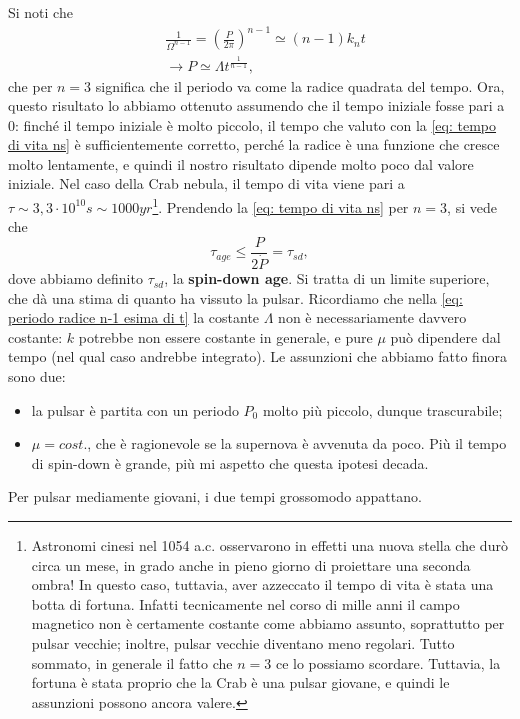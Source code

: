 Si noti che
\begin{align}
    &\frac{1}{\Omega^{n-1}}= \left(\frac{P}{2\pi}\right)^{n-1} \simeq (n-1)k_nt \\
    &\xrightarrow{} P\simeq\Lambda t^{\frac{1}{n-1}},
    \label{eq: periodo radice n-1 esima di t}
\end{align}
che per $n=3$ significa che il periodo va come la radice quadrata del tempo.
Ora, questo risultato lo abbiamo ottenuto assumendo che il tempo iniziale fosse pari a $0$: finché il tempo iniziale è molto piccolo, il tempo che valuto con la \eqref{eq: tempo di vita ns} è sufficientemente corretto, perché la radice è una funzione che cresce molto lentamente, e quindi il nostro risultato dipende molto poco dal valore iniziale.
Nel caso della Crab nebula, il tempo di vita viene pari a $\tau\sim3,3\cdot10^{10}s \sim 1000yr$\footnote{Astronomi cinesi nel 1054 a.c. osservarono in effetti una nuova stella che durò circa un mese, in grado anche in pieno giorno di proiettare una seconda ombra!
In questo caso, tuttavia, aver azzeccato il tempo di vita è stata una botta di fortuna. 
Infatti tecnicamente nel corso di mille anni il campo magnetico non è certamente costante  come abbiamo assunto, soprattutto per pulsar vecchie; inoltre, pulsar vecchie diventano meno regolari. 
Tutto sommato, in generale il fatto che $n=3$ ce lo possiamo scordare.
Tuttavia, la fortuna è stata proprio che la Crab è una pulsar giovane, e quindi le assunzioni possono ancora valere.}. 
Prendendo la \eqref{eq: tempo di vita ns} per $n=3$, si vede che 
\begin{equation}
    \tau_{age}\leq \frac{P}{2\dot{P}} = \tau_{sd},
\end{equation}
dove abbiamo definito $\tau_{sd}$, la \textbf{spin-down age}.
Si tratta di un limite superiore, che dà una stima di quanto ha vissuto la pulsar.
Ricordiamo che nella \eqref{eq: periodo radice n-1 esima di t} la costante $\Lambda$ non è necessariamente davvero costante: $k$ potrebbe non essere costante in generale, e pure $\mu$ può dipendere dal tempo (nel qual caso andrebbe integrato).
Le assunzioni che abbiamo fatto finora sono due:
\begin{itemize}
    \item la pulsar è partita con un periodo $P_0$ molto più piccolo, dunque trascurabile;
    \item $\mu=cost.$, che è ragionevole se la supernova è avvenuta da poco. Più il tempo di spin-down è grande, più mi aspetto che questa ipotesi decada.
\end{itemize}
Per pulsar mediamente giovani, i due tempi grossomodo appattano.

